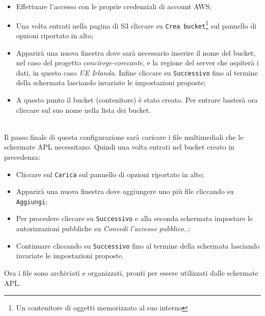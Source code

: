 \begin{minipage}{0.6\textwidth}
	\begin{itemize}
		\item Effettuare l'accesso con le proprie credenziali di account AWS;
    	\item Una volta entrati nella pagina di S3 cliccare su \texttt{Crea bucket}\footnote{Un contenitore di oggetti memorizzato al suo interno} sul pannello di opzioni riportato in alto;
    	\item Apparirà una nuova finestra dove sarà necessario inserire il nome del bucket, nel caso del progetto \textit{concierge-corccante}, e la regione del server che ospiterà i dati, in questo caso \textit{UE Irlanda}. Infine cliccare su \texttt{Successivo} fino al termine della schermata lasciando invariate le impostazioni proposte;
    	\item A questo punto il bucket (contenitore) è stato creato. Per entrare basterà ora cliccare sul suo nome nella lista dei bucket.
	\end{itemize}
\end{minipage}
\\[0.5cm]
Il passo finale di questa configurazione sarà caricare i file multimediali che le schermate APL necessitano. Quindi una volta entrati nel bucket creato in precedenza:
\begin{itemize}
    \item Cliccare sul \texttt{Carica} sul pannello di opzioni riportato in alto;
    \item Apparirà una nuova finestra dove aggiungere uno più file cliccando su \texttt{Aggiungi};
    \item Per procedere cliccare su \texttt{Successivo} e alla seconda schermata impostare le autorizzazioni pubbliche su \textit{Concedi l'accesso pubblico..};
    \item Continuare cliccando su \texttt{Successivo} fino al termine della schermata lasciando invariate le impostazioni proposte.
\end{itemize}
Ora i file sono archiviati e organizzati, pronti per essere utilizzati dalle schermate APL.

